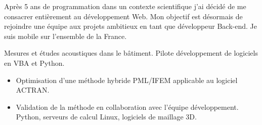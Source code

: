 \documentclass[10pt,a4paper]{altacv}
\begin{document}

\begin{fullwidth}
\makecvheader
\begin{adjustwidth}{30pt}{30pt}
  Apr\`es 5 ans de programmation dans un contexte scientifique j'ai d\'ecid\'e de me consacrer enti\`erement au d\'eveloppement Web. Mon objectif est d\'esormais de rejoindre une \'equipe aux projets ambitieux en tant que d\'eveloppeur Back-end. Je suis mobile sur l'ensemble de la France.
\end{adjustwidth}
\end{fullwidth}




Mesures et \'etudes acoustiques dans le b\^atiment. Pilote d\'eveloppement de logiciels en VBA et Python.

\divider

\begin{itemize}
\item Optimisation d'une m\'ethode hybride PML/IFEM applicable au logiciel ACTRAN.
\item Validation de la m\'ethode en collaboration avec l'\'equipe d\'eveloppement. Python, serveurs de calcul Linux, logiciels de maillage 3D.
\end{itemize}

\divider
\end{document}
